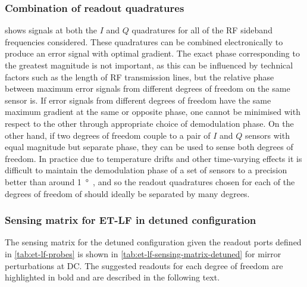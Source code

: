 \subsubsection{Combination of readout quadratures}
 shows signals at both the $I$ and $Q$ quadratures for all of the \gls{RF} sideband frequencies considered. These quadratures can be combined electronically to produce an error signal with optimal gradient. The exact phase corresponding to the greatest magnitude is not important, as this can be influenced by technical factors such as the length of \gls{RF} transmission lines, but the relative phase between maximum error signals from different degrees of freedom on the same sensor is. If error signals from different degrees of freedom have the same maximum gradient at the same or opposite phase, one cannot be minimised with respect to the other through appropriate choice of demodulation phase. On the other hand, if two degrees of freedom couple to a pair of $I$ and $Q$ sensors with equal magnitude but separate phase, they can be used to sense both degrees of freedom. In practice due to temperature drifts and other time-varying effects it is difficult to maintain the demodulation phase of a set of sensors to a precision better than around \SI{1}{\degree}~\cite{Effler2014}, and so the readout quadratures chosen for each of the degrees of freedom of \ETLF{} should ideally be separated by many degrees.

\subsubsection{Sensing matrix for ET-LF in detuned configuration}
The sensing matrix for the detuned configuration given the readout ports defined in \cref{tab:et-lf-probes} is shown in \cref{tab:et-lf-sensing-matrix-detuned} for mirror perturbations at \gls{DC}. The suggested readouts for each degree of freedom are highlighted in bold and are described in the following text.

